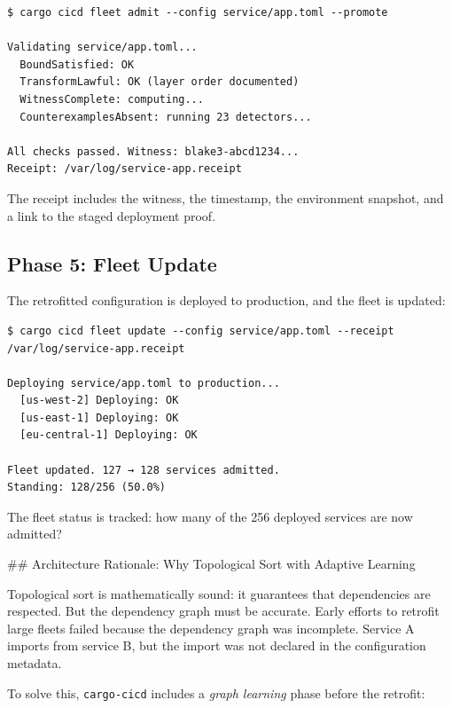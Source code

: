 \begin{lstlisting}[caption={Witness generation: compute standing}]
$ cargo cicd fleet admit --config service/app.toml --promote

Validating service/app.toml...
  BoundSatisfied: OK
  TransformLawful: OK (layer order documented)
  WitnessComplete: computing...
  CounterexamplesAbsent: running 23 detectors...

All checks passed. Witness: blake3-abcd1234...
Receipt: /var/log/service-app.receipt
\end{lstlisting}

The receipt includes the witness, the timestamp, the environment snapshot, and a link to the staged deployment proof.

\subsection{Phase 5: Fleet Update}

The retrofitted configuration is deployed to production, and the fleet is updated:

\begin{lstlisting}[caption={Production deployment: fleet update}]
$ cargo cicd fleet update --config service/app.toml --receipt /var/log/service-app.receipt

Deploying service/app.toml to production...
  [us-west-2] Deploying: OK
  [us-east-1] Deploying: OK
  [eu-central-1] Deploying: OK

Fleet updated. 127 → 128 services admitted.
Standing: 128/256 (50.0%)
\end{lstlisting}

The fleet status is tracked: how many of the 256 deployed services are now admitted?

## Architecture Rationale: Why Topological Sort with Adaptive Learning

Topological sort is mathematically sound: it guarantees that dependencies are respected. But the dependency graph must be accurate. Early efforts to retrofit large fleets failed because the dependency graph was incomplete. Service A imports from service B, but the import was not declared in the configuration metadata.

To solve this, \texttt{cargo-cicd} includes a \emph{graph learning} phase before the retrofit:

